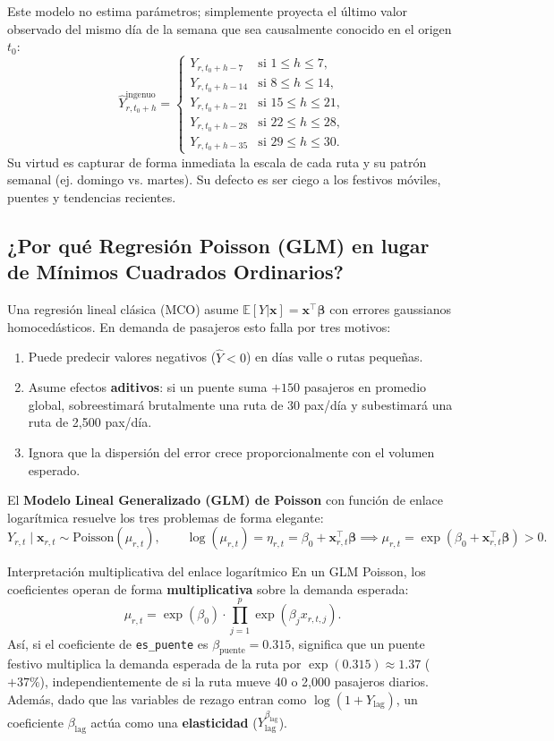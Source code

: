 \documentclass[11pt,a4paper]{article}
\begin{document}
Este modelo no estima parámetros; simplemente proyecta el último valor observado del mismo día de la semana que sea causalmente conocido en el origen $t_0$:
\[
\hat{Y}^{\text{ingenuo}}_{r, t_0+h} =
\begin{cases}
Y_{r, t_0 + h - 7}  & \text{si } 1 \le h \le 7, \\
Y_{r, t_0 + h - 14} & \text{si } 8 \le h \le 14, \\
Y_{r, t_0 + h - 21} & \text{si } 15 \le h \le 21, \\
Y_{r, t_0 + h - 28} & \text{si } 22 \le h \le 28, \\
Y_{r, t_0 + h - 35} & \text{si } 29 \le h \le 30.
\end{cases}
\]
Su virtud es capturar de forma inmediata la escala de cada ruta y su patrón semanal (ej. domingo vs. martes). Su defecto es ser ciego a los festivos móviles, puentes y tendencias recientes.

\subsection{¿Por qué Regresión Poisson (GLM) en lugar de Mínimos Cuadrados Ordinarios?}

Una regresión lineal clásica (MCO) asume $\mathbb{E}[Y|\mathbf{x}] = \mathbf{x}^\top \boldsymbol{\beta}$ con errores gaussianos homocedásticos. En demanda de pasajeros esto falla por tres motivos:
\begin{enumerate}[leftmargin=1.5em]
    \item Puede predecir valores negativos ($\hat{Y} < 0$) en días valle o rutas pequeñas.
    \item Asume efectos \textbf{aditivos}: si un puente suma $+150$ pasajeros en promedio global, sobreestimará brutalmente una ruta de 30 pax/día y subestimará una ruta de 2,500 pax/día.
    \item Ignora que la dispersión del error crece proporcionalmente con el volumen esperado.
\end{enumerate}

El \textbf{Modelo Lineal Generalizado (GLM) de Poisson} con función de enlace logarítmica resuelve los tres problemas de forma elegante:
\[
Y_{r,t} \mid \mathbf{x}_{r,t} \sim \text{Poisson}(\mu_{r,t}), \qquad \log(\mu_{r,t}) = \eta_{r,t} = \beta_0 + \mathbf{x}_{r,t}^\top \boldsymbol{\beta} \implies \mu_{r,t} = \exp(\beta_0 + \mathbf{x}_{r,t}^\top \boldsymbol{\beta}) > 0.
\]

\begin{cajaIntuicion}{Interpretación multiplicativa del enlace logarítmico}
En un GLM Poisson, los coeficientes operan de forma \textbf{multiplicativa} sobre la demanda esperada:
\[
\mu_{r,t} = \exp(\beta_0) \cdot \prod_{j=1}^{p} \exp(\beta_j x_{r,t,j}).
\]
Así, si el coeficiente de \texttt{es\_puente} es $\beta_{\text{puente}} = 0.315$, significa que un puente festivo multiplica la demanda esperada de la ruta por $\exp(0.315) \approx 1.37$ ($+37\%$), independientemente de si la ruta mueve 40 o 2,000 pasajeros diarios. Además, dado que las variables de rezago entran como $\log(1 + Y_{\text{lag}})$, un coeficiente $\beta_{\text{lag}}$ actúa como una \textbf{elasticidad} ($Y_{\text{lag}}^{\beta_{\text{lag}}}$).
\end{cajaIntuicion}
\end{document}
